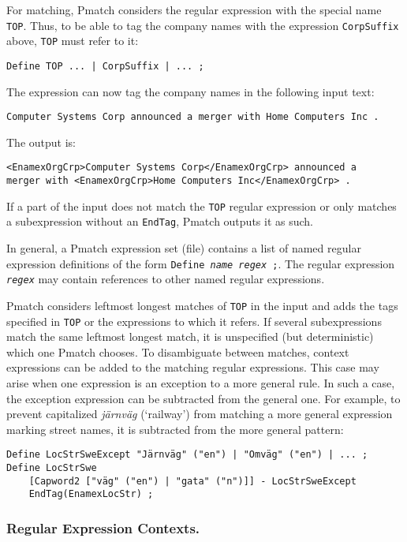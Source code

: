 \documentclass{llncs}
\begin{document}
For matching, Pmatch considers the regular expression with the special
name \texttt{TOP}. Thus, to be able to tag the company names with the
expression \texttt{CorpSuffix} above, \texttt{TOP} must refer to it:
\begin{verbatim}
Define TOP ... | CorpSuffix | ... ;
\end{verbatim}
The expression can now tag the company names in the following input
text:
\begin{verbatim}
Computer Systems Corp announced a merger with Home Computers Inc .
\end{verbatim}
\noindent
The output is:
\begin{verbatim}
<EnamexOrgCrp>Computer Systems Corp</EnamexOrgCrp> announced a
merger with <EnamexOrgCrp>Home Computers Inc</EnamexOrgCrp> .
\end{verbatim}

If a part of the input does not match the \texttt{TOP} regular
expression or only matches a subexpression without an \texttt{EndTag},
Pmatch outputs it as such.

In general, a Pmatch expression set (file) contains a list of named
regular expression definitions of the form \texttt{Define
  \textit{name} \textit{regex} ;}. The regular expression
\texttt{\textit{regex}} may contain references to other named regular
expressions.

Pmatch considers leftmost longest matches of \texttt{TOP} in the input
and adds the tags specified in \texttt{TOP} or the expressions to
which it refers. If several subexpressions match the same leftmost
longest match, it is unspecified (but deterministic) which one Pmatch
chooses. To disambiguate between matches, context expressions can be
added to the matching regular expressions. This case may arise when
one expression is an exception to a more general rule. In such a case,
the exception expression can be subtracted from the general one.
For example, to
prevent capitalized \textit{järnväg} (`railway') from matching a more
general expression marking street names, it is subtracted from the
more general pattern:

\begin{verbatim}
Define LocStrSweExcept "Järnväg" ("en") | "Omväg" ("en") | ... ;
Define LocStrSwe
    [Capword2 ["väg" ("en") | "gata" ("n")]] - LocStrSweExcept
    EndTag(EnamexLocStr) ;
\end{verbatim}

\subsubsection{Regular Expression Contexts.}
\end{document}
